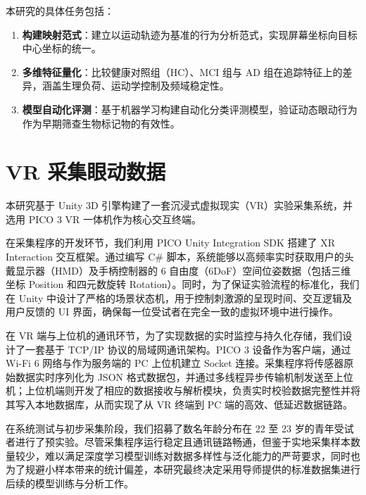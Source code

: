 \documentclass[12pt,hyperref,a4paper,UTF8]{ctexart}
\begin{document}
本研究的具体任务包括：

\begin{enumerate}
    \item \textbf{构建映射范式}：建立以运动轨迹为基准的行为分析范式，实现屏幕坐标向目标中心坐标的统一。
    \item \textbf{多维特征量化}：比较健康对照组（HC）、MCI 组与 AD 组在追踪特征上的差异，涵盖生理负荷、运动学控制及频域稳定性。
    \item \textbf{模型自动化评测}：基于机器学习构建自动化分类评测模型，验证动态眼动行为作为早期筛查生物标记物的有效性。
\end{enumerate}


















\section{VR 采集眼动数据}
本研究基于 Unity 3D 引擎构建了一套沉浸式虚拟现实（VR）实验采集系统，并选用 PICO 3 VR 一体机作为核心交互终端。

在采集程序的开发环节，我们利用 PICO Unity Integration SDK 搭建了 XR Interaction 交互框架。通过编写 C\# 脚本，系统能够以高频率实时获取用户的头戴显示器（HMD）及手柄控制器的 6 自由度（6DoF）空间位姿数据（包括三维坐标 Position 和四元数旋转 Rotation）。同时，为了保证实验流程的标准化，我们在 Unity 中设计了严格的场景状态机，用于控制刺激源的呈现时间、交互逻辑及用户反馈的 UI 界面，确保每一位受试者在完全一致的虚拟环境中进行操作。

在 VR 端与上位机的通讯环节，为了实现数据的实时监控与持久化存储，我们设计了一套基于 TCP/IP 协议的局域网通讯架构。PICO 3 设备作为客户端，通过 Wi-Fi 6 网络与作为服务端的 PC 上位机建立 Socket 连接。采集程序将传感器原始数据实时序列化为 JSON 格式数据包，并通过多线程异步传输机制发送至上位机；上位机端则开发了相应的数据接收与解析模块，负责实时校验数据完整性并将其写入本地数据库，从而实现了从 VR 终端到 PC 端的高效、低延迟数据链路。

在系统测试与初步采集阶段，我们招募了数名年龄分布在 22 至 23 岁的青年受试者进行了预实验。尽管采集程序运行稳定且通讯链路畅通，但鉴于实地采集样本数量较少，难以满足深度学习模型训练对数据多样性与泛化能力的严苛要求，同时也为了规避小样本带来的统计偏差，本研究最终决定采用导师提供的标准数据集进行后续的模型训练与分析工作。
\end{document}
